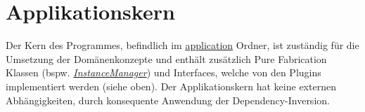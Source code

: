 \section{Applikationskern}

Der Kern des Programmes, befindlich im \href{https://github.com/moorts/Morik/tree/main/src/application}{application} Ordner, ist zuständig für die Umsetzung der Domänenkonzepte und enthält zusätzlich Pure Fabrication Klassen (bspw. \href{https://github.com/moorts/Morik/blob/main/src/application/InstanceManager.h}{\textit{InstanceManager}}) und Interfaces, welche von den Plugins implementiert werden (siehe oben). Der Applikationskern hat keine externen Abhängigkeiten, durch konsequente Anwendung der Dependency-Inversion. 
